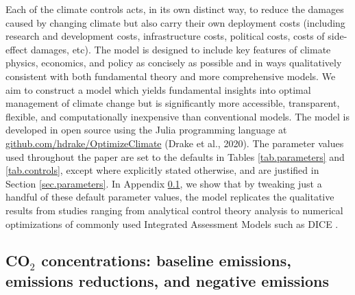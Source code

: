 \documentclass{article}
\begin{document}
Each of the climate controls acts, in its own distinct way, to reduce the damages caused by  changing climate but also carry their own deployment costs (including research and development costs, infrastructure costs, political costs, costs of side-effect damages, etc). The model is designed to include key features of climate physics, economics, and policy as concisely as possible and in ways qualitatively consistent with both fundamental theory and more comprehensive models. We aim to construct a model which yields fundamental insights into optimal management of climate change but is significantly more accessible, transparent, flexible, and computationally inexpensive than conventional models. The model is developed in open source using the Julia programming language \citep{bezanson_julia:_2017} at \href{github.com/hdrake/OptimizeClimate}{github.com/hdrake/OptimizeClimate} (Drake et al., 2020). The parameter values used throughout the paper are set to the defaults in Tables \ref{tab.parameters} and \ref{tab.controls}, except where explicitly stated otherwise, and are justified in Section \ref{sec.parameters}. In Appendix \ref{}, we show that by tweaking just a handful of these default parameter values, the model replicates the qualitative results from studies ranging from analytical control theory analysis \citep{soldatenko_optimal_2018} to numerical optimizations of commonly used Integrated Assessment Models such as DICE \citep{belaia_optimal_2019}.

\subsection{CO$_{2}$ concentrations: baseline emissions, emissions reductions, and negative emissions}
\end{document}
